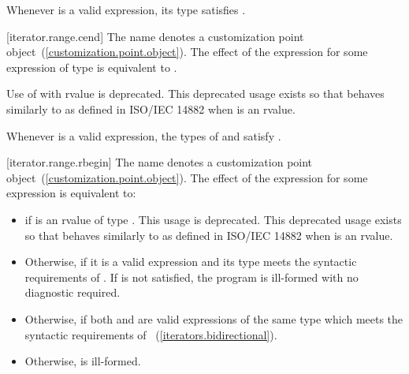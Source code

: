 \pnum
\enternote Whenever  is a valid expression, its
type satisfies . \exitnote

[iterator.range.cend]{}
\pnum
The name  denotes a customization point
object~(\ref{customization.point.object}). The effect of the expression
 for some expression  of type 
is equivalent to .

\pnum
Use of  with rvalue  is deprecated.
\enternote This deprecated usage exists so that 
behaves similarly to  as defined in ISO/IEC 14882 when
 is an rvalue. \exitnote

\pnum
\enternote Whenever  is a valid expression, the
types of  and  satisfy
. \exitnote

[iterator.range.rbegin]{}
\pnum
The name  denotes a customization point
object~(\ref{customization.point.object}). The effect of the expression
 for some expression  is equivalent
to:

\begin{itemize}
\item
   if  is an rvalue of
  type . This usage is deprecated.
  \enternote This deprecated usage exists so that
   behaves similarly to 
  as defined in ISO/IEC 14882 when  is an rvalue. \exitnote

\item
  Otherwise,  if it is a valid expression and its type  meets the
  syntactic requirements of . If 
  is not satisfied, the program is ill-formed with no diagnostic
  required.

\item
  Otherwise,  if both
   and  are valid expressions of the same
  type  which meets the syntactic requirements of
  ~(\ref{iterators.bidirectional}).

\item
  Otherwise,  is ill-formed.
\end{itemize}

